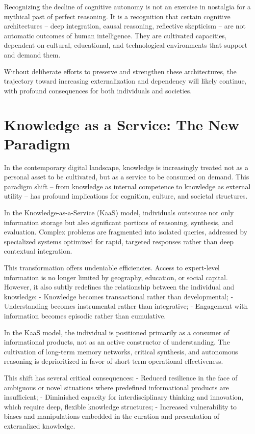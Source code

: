 Recognizing the decline of cognitive autonomy is not an exercise in
nostalgia for a mythical past of perfect reasoning. It is a recognition
that certain cognitive architectures -- deep integration, causal
reasoning, reflective skepticism -- are not automatic outcomes of human
intelligence. They are cultivated capacities, dependent on cultural,
educational, and technological environments that support and demand
them.

Without deliberate efforts to preserve and strengthen these
architectures, the trajectory toward increasing externalization and
dependency will likely continue, with profound consequences for both
individuals and societies.




\section{Knowledge as a Service: The New Paradigm}

In the contemporary digital landscape, knowledge is increasingly treated
not as a personal asset to be cultivated, but as a service to be
consumed on demand. This paradigm shift -- from knowledge as internal
competence to knowledge as external utility -- has profound implications
for cognition, culture, and societal structures.

In the Knowledge-as-a-Service (KaaS) model, individuals outsource not
only information storage but also significant portions of reasoning,
synthesis, and evaluation. Complex problems are fragmented into isolated
queries, addressed by specialized systems optimized for rapid, targeted
responses rather than deep contextual integration.

This transformation offers undeniable efficiencies. Access to
expert-level information is no longer limited by geography, education,
or social capital. However, it also subtly redefines the relationship
between the individual and knowledge: - Knowledge becomes transactional
rather than developmental; - Understanding becomes instrumental rather
than integrative; - Engagement with information becomes episodic rather
than cumulative.

In the KaaS model, the individual is positioned primarily as a consumer
of informational products, not as an active constructor of
understanding. The cultivation of long-term memory networks, critical
synthesis, and autonomous reasoning is deprioritized in favor of
short-term operational effectiveness.

This shift has several critical consequences: - Reduced resilience in
the face of ambiguous or novel situations where predefined informational
products are insufficient; - Diminished capacity for interdisciplinary
thinking and innovation, which require deep, flexible knowledge
structures; - Increased vulnerability to biases and manipulations
embedded in the curation and presentation of externalized knowledge.

